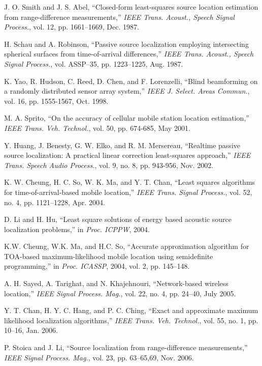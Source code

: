 \begin{thebibliography}{99}


J. O. Smith and J. S. Abel, ``Closed-form least-squares source location
estimation from range-difference measurements,'' {\em IEEE Trans. Acoust.,
Speech Signal Process.}, vol. 12, pp. 1661--1669, Dec. 1987.

H. Schau and A. Robinson, ``Passive source localization employing intersecting spherical surfaces from time-of-arrival differences,'' {\em IEEE Trans. Acoust., Speech Signal Process.}, vol. ASSP--35, pp. 1223--1225, Aug. 1987.

K. Yao, R. Hudson, C. Reed, D. Chen, and F. Lorenzelli, ``Blind beamforming on a randomly
distributed sensor array system,'' {\em IEEE J. Select. Areas Commun.}, vol. 16, pp. 1555-1567, Oct. 1998.

 M. A. Sprito, ``On the accuracy of cellular mobile station location estimation,'' {\em IEEE Trans. Veh. Technol.}, vol. 50, pp. 674-685, May 2001.

 Y. Huang, J. Benesty, G. W. Elko, and R. M. Mersereau, ``Realtime passive source localization: A practical linear correction least-squares approach,'' {\em IEEE Trans. Speech Audio Process.}, vol. 9, no. 8, pp. 943-956, Nov. 2002.

 K. W. Cheung, H. C. So, W. K. Ma, and Y. T. Chan, ``Least squares algorithms for time-of-arrival-based mobile location,'' {\em IEEE Trans. Signal Process.}, vol. 52, no. 4, pp. 1121--1228, Apr. 2004.

D. Li and H. Hu, ``Least square solutions of energy based acoustic source localization problems,'' in {\em Proc. ICPPW}, 2004.

K.W. Cheung, W.K. Ma, and H.C. So, ``Accurate approximation algorithm for TOA-based maximum-likelihood mobile location using semidefinite programming,'' in {\em Proc. ICASSP}, 2004, vol. 2, pp. 145--148.

A. H. Sayed, A. Tarighat, and N. Khajehnouri, ``Network-based wireless location,'' {\em IEEE Signal Process. Mag.}, vol. 22, no. 4, pp. 24--40, July 2005.

 Y. T. Chan, H. Y. C. Hang, and P. C. Ching, ``Exact and approximate maximum likelihood localization algorithms,'' {\em IEEE Trans. Veh. Technol.}, vol. 55, no. 1, pp. 10--16, Jan. 2006.

P. Stoica and J. Li, ``Source localization from range-difference measurements,''
{\em IEEE Signal Process. Mag.}, vol. 23, pp. 63--65,69, Nov.
2006.


\end{thebibliography}
